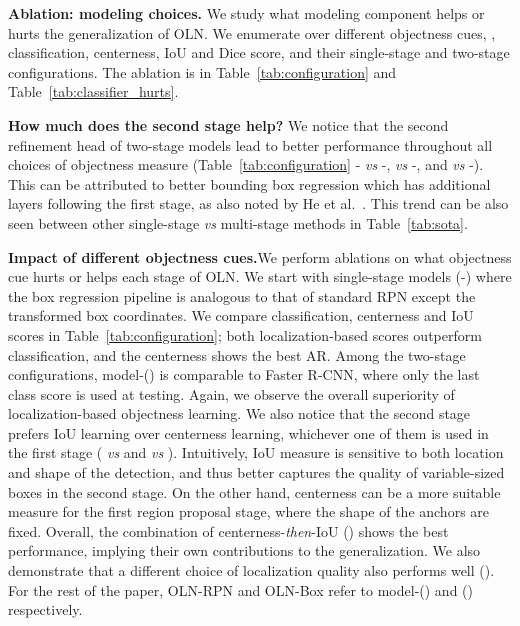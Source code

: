 \documentclass[10pt,twocolumn,letterpaper]{article}
\newcommand{\tableref}[1]{Table~\ref{#1}}
\renewcommand{\paragraph}[1]{\vspace{1mm}\noindent\textbf{#1}}
\begin{document}
\paragraph{{Ablation: modeling choices.}}\quad
We study what modeling component helps or hurts the generalization of OLN. We enumerate over different objectness cues, \ie, classification, centerness, IoU and Dice score, and their single-stage and two-stage configurations. The ablation is in \tableref{tab:configuration} and \tableref{tab:classifier_hurts}. 

\paragraph{{How much does the second stage help?}}\quad 
We notice that the second refinement head of two-stage models lead to better performance throughout all choices of objectness measure (\tableref{tab:configuration} -  \textit{vs} -,   \textit{vs} -, and  \textit{vs} -). This can be attributed to better bounding box regression which has additional layers following the first stage, as also noted by He et al.~\cite{he2017mask}. This trend can be also seen between other single-stage \textit{vs} multi-stage methods in \tableref{tab:sota}. 


\paragraph{{Impact of different objectness cues.}}\quad We perform ablations on what objectness cue hurts or helps each stage of OLN. We start with single-stage models (-) where the box regression pipeline is analogous to that of standard RPN except the transformed box coordinates. We compare classification, centerness and IoU scores in \tableref{tab:configuration}; both localization-based scores outperform classification, and the centerness shows the best AR. Among the two-stage configurations, model-() is comparable to Faster R-CNN, where only the last class score is used at testing. Again, we observe the overall superiority of localization-based objectness learning. We also notice that the second stage prefers IoU learning over centerness learning, whichever one of them is used in the first stage ( \textit{vs}  and  \textit{vs} ). Intuitively, IoU measure is sensitive to both location and shape of the detection, and thus better captures the quality of variable-sized boxes in the second stage. On the other hand, centerness can be a more suitable measure for the first region proposal stage, where the shape of the anchors are fixed. Overall, the combination of centerness-\textit{then}-IoU () shows the best performance, implying their own contributions to the generalization. We also demonstrate that a different choice of localization quality also performs well (). For the rest of the paper, OLN-RPN and OLN-Box refer to model-() and () respectively.
\end{document}
